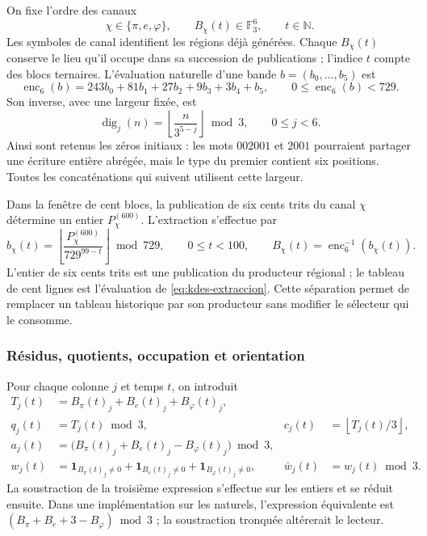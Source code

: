 On fixe l'ordre des canaux
\[
 \chi\in\{\pi,e,\varphi\},
 \qquad B_\chi(t)\in\mathbb F_3^6,
 \qquad t\in\mathbb N.
\]
Les symboles de canal identifient les régions déjà générées. Chaque
$B_\chi(t)$ conserve le lieu qu'il occupe dans sa succession de publications ;
l'indice $t$ compte des blocs ternaires. L'évaluation naturelle d'une
bande $b=(b_0,\ldots,b_5)$ est
\begin{equation}
 \operatorname{enc}_6(b)=
 243b_0+81b_1+27b_2+9b_3+3b_4+b_5,
 \qquad 0\leq\operatorname{enc}_6(b)<729.
 \label{eq:kdes-enc6}
\end{equation}
Son inverse, avec une largeur fixée, est
\[
 \operatorname{dig}_j(n)=
 \left\lfloor\frac{n}{3^{5-j}}\right\rfloor\bmod3,
 \qquad 0\leq j<6.
\]
Ainsi sont retenus les zéros initiaux : les mots $002001$ et $2001$
pourraient partager une écriture entière abrégée, mais le type du
premier contient six positions. Toutes les concaténations qui suivent
utilisent cette largeur.

Dans la fenêtre de cent blocs, la publication de six cents trits du
canal $\chi$ détermine un entier $P_\chi^{(600)}$. L'extraction s'effectue
par
\begin{equation}
 b_\chi(t)=
 \left\lfloor\frac{P_\chi^{(600)}}{729^{99-t}}\right\rfloor\bmod729,
 \qquad 0\leq t<100,
 \qquad B_\chi(t)=\operatorname{enc}_6^{-1}(b_\chi(t)).
 \label{eq:kdes-extraccion}
\end{equation}
L'entier de six cents trits est une publication du producteur régional ;
le tableau de cent lignes est l'évaluation de
\eqref{eq:kdes-extraccion}. Cette séparation permet de remplacer un tableau
historique par son producteur sans modifier le sélecteur qui le consomme.

\subsubsection{Résidus, quotients, occupation et orientation}

Pour chaque colonne $j$ et temps $t$, on introduit
\begin{align}
 T_j(t)&=B_\pi(t)_j+B_e(t)_j+B_\varphi(t)_j,\\
 q_j(t)&=T_j(t)\bmod3,
 &c_j(t)&=\left\lfloor T_j(t)/3\right\rfloor,\\
 a_j(t)&=\bigl(B_\pi(t)_j+B_e(t)_j-B_\varphi(t)_j\bigr)\bmod3,\\
 w_j(t)&=\mathbf1_{B_\pi(t)_j\ne0}
       +\mathbf1_{B_e(t)_j\ne0}
       +\mathbf1_{B_\varphi(t)_j\ne0},
 &\bar w_j(t)&=w_j(t)\bmod3.
 \label{eq:kdes-firmas}
\end{align}
La soustraction de la troisième expression s'effectue sur les entiers et se réduit
ensuite. Dans une implémentation sur les naturels, l'expression équivalente
est $(B_\pi+B_e+3-B_\varphi)\bmod3$ ; la soustraction tronquée altérerait le lecteur.

